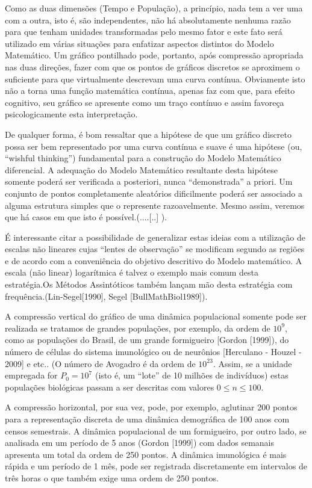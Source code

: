     Como as duas dimensões (Tempo e População), a princípio, nada tem a ver uma com a outra, isto é, são independentes, não há absolutamente nenhuma razão para que tenham unidades transformadas pelo mesmo fator e este fato será utilizado em várias situações para enfatizar aspectos distintos do Modelo Matemático. Um gráfico pontilhado pode, portanto, após compressão apropriada nas duas direções, fazer com que os pontos de gráficos discretos se aproximem o suficiente para que virtualmente descrevam uma curva contínua. Obviamente isto não a torna uma função matemática contínua, apenas faz com que, para efeito cognitivo, seu gráfico se apresente como um traço contínuo e assim favoreça psicologicamente esta interpretação.

    De qualquer forma, é bom ressaltar que a hipótese de que um gráfico discreto possa ser bem representado por uma curva contínua e suave é uma hipótese (ou, ``wishful thinking'') fundamental para a construção do Modelo Matemático diferencial. A adequação do Modelo Matemático resultante desta hipótese somente poderá ser verificada a posteriori, nunca ``demonstrada'' a priori. Um conjunto de pontos completamente aleatórios dificilmente poderá ser associado a alguma estrutura simples que o represente razoavelmente. Mesmo assim, veremos que há casos em que isto é possível.(....[..] ).

    É interessante citar a possibilidade de generalizar estas ideias com a utilização de escalas não lineares cujas ``lentes de observação'' se modificam segundo as regiões e de acordo com a conveniência do objetivo descritivo do Modelo matemático. A escala (não linear) logarítmica é talvez o exemplo mais comum desta estratégia.Os Métodos Assintóticos também lançam mão desta estratégia com frequência.(Lin-Segel[1990], Segel [BullMathBiol1989]). 

    A compressão vertical do gráfico de uma dinâmica populacional somente pode ser realizada se tratamos de grandes populações, por exemplo, da ordem de \(10^9\), como as populações do Brasil, de um grande formigueiro [Gordon [1999]), do número de células do sistema imunológico ou de neurônios [Herculano - Houzel - 2009] e etc.. (O número de Avogadro é da ordem de \(10^{23}\). Assim, se a unidade empregada for \(P_0 = 10^7\) (isto é, um ``lote'' de 10 milhões de indivíduos) estas populações biológicas passam a ser descritas com valores \(0 \le n \le 100\).

    A compressão horizontal, por sua vez, pode, por exemplo, aglutinar 200 pontos para a representação discreta de uma dinâmica demográfica de 100 anos com censos semestrais. A dinâmica populacional de um formigueiro, por outro lado, se analisada em um período de 5 anos (Gordon [1999]) com dados semanais apresenta um total da ordem de 250 pontos. A dinâmica imunológica é mais rápida e um período de 1 mês, pode ser registrada discretamente em intervalos de três horas o que também exige uma ordem de 250 pontos. 

